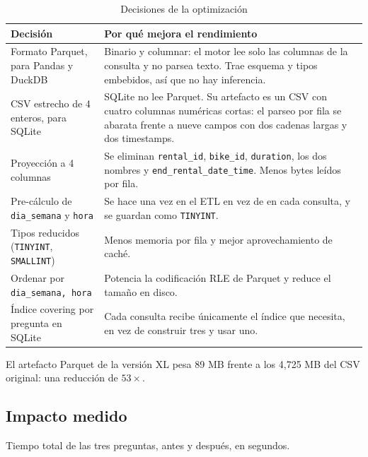 \begin{table}[htbp]
\centering
\footnotesize
\caption{Decisiones de la optimización}
\label{tab:fase3-decisiones}
\begin{tabularx}{\textwidth}{>{\raggedright\arraybackslash}p{4.2cm}X}
\toprule
Decisión & Por qué mejora el rendimiento \\
\midrule
Formato Parquet, para Pandas y DuckDB & Binario y columnar: el motor lee solo las columnas de la consulta y no parsea texto. Trae esquema y tipos embebidos, así que no hay inferencia. \\
CSV estrecho de 4 enteros, para SQLite & SQLite no lee Parquet. Su artefacto es un CSV con cuatro columnas numéricas cortas: el parseo por fila se abarata frente a nueve campos con dos cadenas largas y dos timestamps. \\
Proyección a 4 columnas & Se eliminan \texttt{rental\_id}, \texttt{bike\_id}, \texttt{duration}, los dos nombres y \texttt{end\_rental\_date\_time}. Menos bytes leídos por fila. \\
Pre-cálculo de \texttt{dia\_semana} y \texttt{hora} & Se hace una vez en el ETL en vez de en cada consulta, y se guardan como \texttt{TINYINT}. \\
Tipos reducidos (\texttt{TINYINT}, \texttt{SMALLINT}) & Menos memoria por fila y mejor aprovechamiento de caché. \\
Ordenar por \texttt{dia\_semana, hora} & Potencia la codificación RLE de Parquet y reduce el tamaño en disco. \\
Índice covering por pregunta en SQLite & Cada consulta recibe únicamente el índice que necesita, en vez de construir tres y usar uno. \\
\bottomrule
\end{tabularx}
\end{table}

El artefacto Parquet de la versión XL pesa 89 MB frente a los 4,725 MB del CSV original: una reducción de $53\times$.

\subsection{Impacto medido}

Tiempo total de las tres preguntas, antes y después, en segundos.

